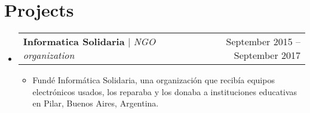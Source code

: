 \documentclass[letterpaper,11pt]{article}
\makeatletter
\newcommand{\resumeItem}[1]{
  \item\small{
    {#1 \vspace{-2pt}}
  }
}
\newcommand{\resumeProjectHeading}[2]{
    \item
    \begin{tabular*}{0.97\textwidth}{l@{\extracolsep{\fill}}r}
      \small#1 & #2 \\
    \end{tabular*}\vspace{-7pt}
}
\newcommand{\resumeSubHeadingListStart}{\begin{itemize}[leftmargin=0.15in, label={}]}
\newcommand{\resumeSubHeadingListEnd}{\end{itemize}}
\newcommand{\resumeItemListStart}{\begin{itemize}}
\newcommand{\resumeItemListEnd}{\end{itemize}\vspace{-5pt}}
\makeatother
\begin{document}
\section{Projects}
    \resumeSubHeadingListStart
      \resumeProjectHeading
          {\textbf{Informatica Solidaria} $|$ \emph{NGO organization}}{September 2015 -- September 2017}
          \resumeItemListStart
            \resumeItem{Fundé Informática Solidaria, una organización que recibía equipos electrónicos usados, los reparaba y los donaba a instituciones educativas en Pilar, Buenos Aires, Argentina.}
          \resumeItemListEnd
    \resumeSubHeadingListEnd



%


\end{document}
